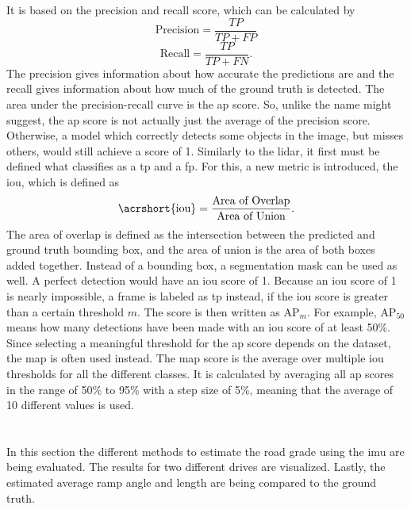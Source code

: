 It is based on the precision and recall score, which can be calculated by
\begin{equation}
    \text{Precision} = \frac{TP}{TP+FP}
\end{equation}
\begin{equation}
    \text{Recall} = \frac{TP}{TP+FN}.
\end{equation}
The precision gives information about how accurate the predictions are and the recall gives information about how much of the ground truth is detected.
The area under the precision-recall curve is the \gls{ap} score.
So, unlike the name might suggest, the \gls{ap} score is not actually just the average of the precision score.
Otherwise, a model which correctly detects some objects in the image, but misses others, would still achieve a score of 1.
Similarly to the \gls{lidar}, it first must be defined what classifies as a \gls{tp} and a \gls{fp}.
For this, a new metric is introduced, the \gls{iou}, which is defined as
\begin{equation}
    \text{\acrshort{iou}} = \frac{\text{Area of Overlap}}{\text{Area of Union}}.
\end{equation}
The area of overlap is defined as the intersection between the predicted and ground truth bounding box, and the area of union is the area of both boxes added together.
Instead of a bounding box, a segmentation mask can be used as well.
A perfect detection would have an \gls{iou} score of 1.
Because an \gls{iou} score of 1 is nearly impossible, a frame is labeled as \gls{tp} instead, if the \gls{iou} score is greater than a certain threshold $m$.
The score is then written as $\text{AP}_{m}$.
For example, $\text{AP}_{50}$ means how many detections have been made with an \gls{iou} score of at least 50\%.
Since selecting a meaningful threshold for the \gls{ap} score depends on the dataset, the \gls{map} is often used instead.
The \gls{map} score is the average over multiple \gls{iou} thresholds for all the different classes.
It is calculated by averaging all \gls{ap} scores in the range of 50\% to 95\% with a step size of 5\%, meaning that the average of 10 different values is used.
\section{}
\label{sec:eval_imu}
In this section the different methods to estimate the road grade using the \gls{imu} are being evaluated.
The results for two different drives are visualized.
Lastly, the estimated average ramp angle and length are being compared to the ground truth.

